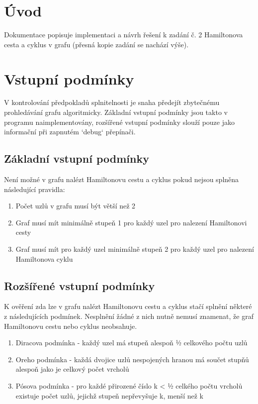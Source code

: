\documentclass[a4paper,11pt]{article}
\begin{document}
\section{Úvod}

Dokumentace popisuje implementaci a návrh řešení k zadání č. 2 Hamiltonova cesta a cyklus v grafu (přesná kopie zadání se nachází výše).

\section{Vstupní podmínky}

V kontrolování předpokladů splnitelnosti je snaha předejít zbytečnému prohledávání grafu algoritmicky. Základní vstupní podmínky jsou takto v programu naimplementovány, rozšířené vstupní podmínky slouží pouze jako informační při zapnutém `debug` přepínači. 

\subsection{Základní vstupní podmínky}

Není možné v grafu nalézt Hamiltonovu cestu a cyklus pokud nejsou splněna následující pravidla:
\begin{enumerate}
	\item Počet uzlů v grafu musí být větší než 2
	\item Graf musí mít minimálně stupeň 1 pro každý uzel pro nalezení Hamiltonovi cesty
    \item Graf musí mít pro každý uzel minimálně stupeň 2 pro každý uzel pro nalezení Hamiltonova cyklu
\end{enumerate}

\subsection{Rozšířené vstupní podmínky}

K ověření zda lze v grafu nalézt Hamiltonovu cestu a cyklus stačí splnění některé z následujících podmínek. Nesplnění žádné z nich nutně nemusí znamenat, že graf Hamiltonovu cestu nebo cyklus neobsahuje.
\begin{enumerate}
    \item Diracova podmínka - každý uzel má stupeň alespoň ½ celkového počtu uzlů
    \item Oreho podmínka - každá dvojice uzlů nespojených hranou má součet stupňů alespoň jako je celkový počet vrcholů
    \item Pósova podmínka - pro každé přirozené číslo k < ½ celkého počtu vrcholů existuje počet uzlů, jejichž stupeň nepřevyšuje k, menší než k
\end{enumerate}
\end{document}
